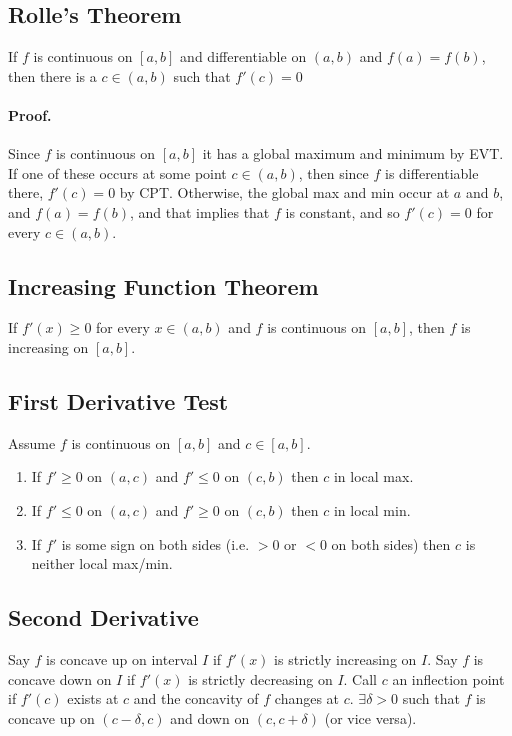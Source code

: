 \documentclass[11pt]{article}
\begin{document}
\subsection{Rolle's Theorem}
If $f$ is continuous on $[a, b]$ and differentiable on $(a, b)$ and $f(a) = f(b)$, then there is a $c \in (a, b)$ such that $f'(c) = 0$

\paragraph{Proof.}
Since $f$ is continuous on $[a, b]$ it has a global maximum and minimum by EVT. If one of these occurs at some point $c \in (a, b)$, then since $f$ is differentiable there, $f'(c) = 0$ by CPT. Otherwise, the global max and min occur at $a$ and $b$, and $f(a) = f(b)$, and that implies that $f$ is constant, and so $f'(c) = 0$ for every $c \in (a, b)$.

\subsection{Increasing Function Theorem}
If $f'(x) \geq 0$ for every $x \in (a, b)$ and $f$ is continuous on $[a, b]$, then $f$ is increasing on $[a, b]$.

\subsection{First Derivative Test}
Assume $f$ is continuous on $[a, b]$ and $c \in [a, b]$.
\begin{enumerate}
	\item If $f' \geq 0$ on $(a, c)$ and $f' \leq 0$ on $(c, b)$ then $c$ in local max.
	\item If $f' \leq 0$ on $(a, c)$ and $f' \geq 0$ on $(c, b)$ then $c$ in local min.
	\item If $f'$ is some sign on both sides (i.e. $> 0$ or $< 0$ on both sides) then $c$ is neither local max/min.
\end{enumerate}

\subsection{Second Derivative}
Say $f$ is concave up on interval $I$ if $f'(x)$ is strictly increasing on $I$. Say $f$ is concave down on $I$ if $f'(x)$ is strictly
decreasing on $I$. Call $c$ an inflection point if $f'(c)$ exists at $c$ and the concavity of $f$ changes at $c$. $\exists \delta > 0$ such that $f$ is concave up on $(c - \delta, c)$ and down on $(c, c + \delta)$ (or vice versa).
\end{document}
